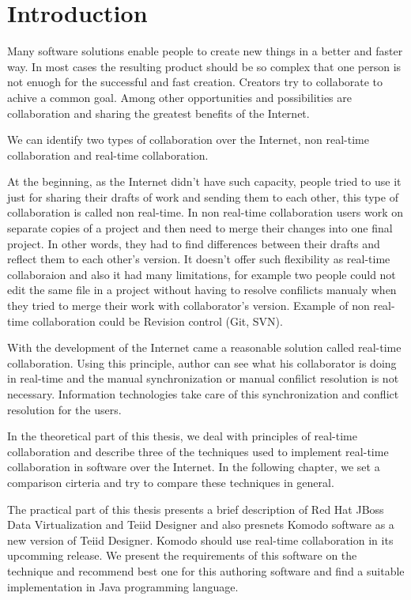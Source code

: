 \documentclass[12pt,oneside]{fithesis2}
\begin{document}
\chapter{Introduction} 
Many software solutions enable people to create new things in a better and faster way. In most cases the resulting product should be so complex that one person is not enuogh for the successful and fast creation. Creators try to collaborate to achive a common goal. Among other opportunities and possibilities are collaboration and sharing the greatest benefits of the Internet. \par
We can identify two types of collaboration over the Internet, non real-time collaboration and real-time collaboration. 
\par At the beginning, as the Internet didn't have such capacity, people tried to use it just for sharing their drafts of work and sending them to each other, this type of collaboration is called non real-time. In non real-time collaboration users work on separate copies of a project and then need to merge their changes into one final project. In other words, they had to find differences between their drafts and reflect them to each other's version. It doesn't offer such flexibility as real-time collaboraion and also it had many limitations, for example two people could not edit the same file in a project without having to resolve confilicts manualy when they tried to merge their work with collaborator's version. Example of non real-time collaboration could be Revision control (Git, SVN).\par
With the development of the Internet came a reasonable solution called real-time collaboration. Using this principle, author can see what his collaborator is doing in real-time and the manual synchronization or manual confilict resolution is not necessary. Information technologies take care of this synchronization and conflict resolution for the users.
\par In the theoretical part of this thesis, we deal with principles of real-time collaboration and describe three of the techniques used to implement real-time collaboration in software over the Internet. In the following chapter, we set a comparison cirteria and try to compare these techniques in general. 
\par The practical part of this thesis presents a brief description of Red Hat JBoss Data Virtualization and Teiid Designer and also presnets Komodo software as a new version of Teiid Designer. Komodo should use real-time collaboration in its upcomming release. We present the requirements of this software on the technique and recommend best one for this authoring software and find a suitable implementation in Java programming language.
\end{document}
